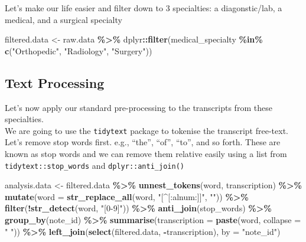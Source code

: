 \documentclass[
]{article}
\newenvironment{Shaded}{\begin{snugshade}}{\end{snugshade}}
\newcommand{\AttributeTok}[1]{\textcolor[rgb]{0.13,0.29,0.53}{#1}}
\newcommand{\FunctionTok}[1]{\textcolor[rgb]{0.13,0.29,0.53}{\textbf{#1}}}
\newcommand{\NormalTok}[1]{#1}
\newcommand{\OtherTok}[1]{\textcolor[rgb]{0.56,0.35,0.01}{#1}}
\newcommand{\SpecialCharTok}[1]{\textcolor[rgb]{0.81,0.36,0.00}{\textbf{#1}}}
\newcommand{\StringTok}[1]{\textcolor[rgb]{0.31,0.60,0.02}{#1}}
\begin{document}
Let's make our life easier and filter down to 3 specialties: a
diagonstic/lab, a medical, and a surgical specialty

\begin{Shaded}
\begin{Highlighting}[]
\NormalTok{filtered.data }\OtherTok{\textless{}{-}}\NormalTok{ raw.data }\SpecialCharTok{\%\textgreater{}\%}\NormalTok{ dplyr}\SpecialCharTok{::}\FunctionTok{filter}\NormalTok{(medical\_specialty }\SpecialCharTok{\%in\%} \FunctionTok{c}\NormalTok{(}\StringTok{"Orthopedic"}\NormalTok{, }\StringTok{"Radiology"}\NormalTok{, }\StringTok{"Surgery"}\NormalTok{)) }
\end{Highlighting}
\end{Shaded}

\subsection{Text Processing}\label{text-processing}

Let's now apply our standard pre-processing to the transcripts from
these specialties.\\
We are going to use the \texttt{tidytext} package to tokenise the
transcript free-text.\\
Let's remove stop words first. e.g., ``the'', ``of'', ``to'', and so
forth. These are known as stop words and we can remove them relative
easily using a list from \texttt{tidytext::stop\_words} and
\texttt{dplyr::anti\_join()}

\begin{Shaded}
\begin{Highlighting}[]
\NormalTok{analysis.data }\OtherTok{\textless{}{-}}\NormalTok{ filtered.data }\SpecialCharTok{\%\textgreater{}\%}
  \FunctionTok{unnest\_tokens}\NormalTok{(word, transcription) }\SpecialCharTok{\%\textgreater{}\%}
  \FunctionTok{mutate}\NormalTok{(}\AttributeTok{word =} \FunctionTok{str\_replace\_all}\NormalTok{(word, }\StringTok{"[\^{}[:alnum:]]"}\NormalTok{, }\StringTok{""}\NormalTok{)) }\SpecialCharTok{\%\textgreater{}\%}
  \FunctionTok{filter}\NormalTok{(}\SpecialCharTok{!}\FunctionTok{str\_detect}\NormalTok{(word, }\StringTok{"[0{-}9]"}\NormalTok{)) }\SpecialCharTok{\%\textgreater{}\%}
  \FunctionTok{anti\_join}\NormalTok{(stop\_words) }\SpecialCharTok{\%\textgreater{}\%}
  \FunctionTok{group\_by}\NormalTok{(note\_id) }\SpecialCharTok{\%\textgreater{}\%}
  \FunctionTok{summarise}\NormalTok{(}\AttributeTok{transcription =} \FunctionTok{paste}\NormalTok{(word, }\AttributeTok{collapse =} \StringTok{" "}\NormalTok{)) }\SpecialCharTok{\%\textgreater{}\%}
  \FunctionTok{left\_join}\NormalTok{(}\FunctionTok{select}\NormalTok{(filtered.data, }\SpecialCharTok{{-}}\NormalTok{transcription), }\AttributeTok{by =} \StringTok{"note\_id"}\NormalTok{)}
\end{Highlighting}
\end{Shaded}
\end{document}
